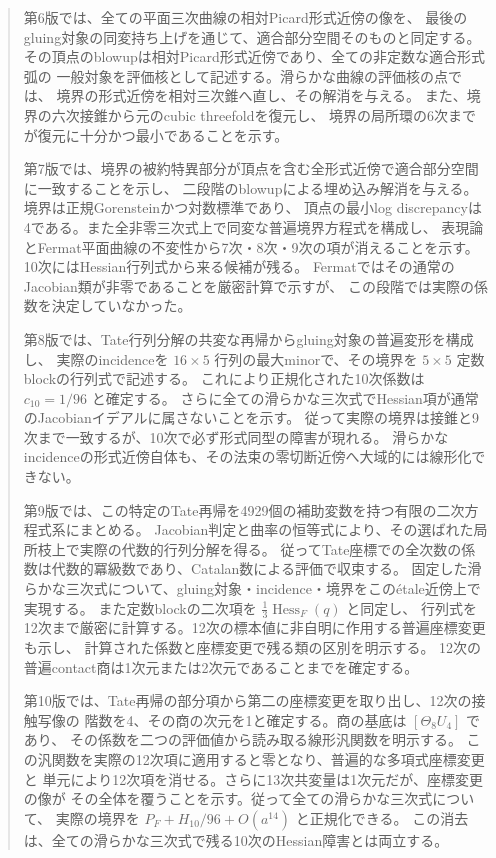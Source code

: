 \documentclass[a4paper,11pt]{ltjsarticle}
\theoremstyle{definition}
\begin{document}
\begin{abstract}
第6版では、全ての平面三次曲線の相対Picard形式近傍の像を、
最後のgluing対象の同変持ち上げを通じて、適合部分空間そのものと同定する。
その頂点のblowupは相対Picard形式近傍であり、全ての非定数な適合形式弧の
一般対象を評価核として記述する。滑らかな曲線の評価核の点では、
境界の形式近傍を相対三次錐へ直し、その解消を与える。
また、境界の六次接錐から元のcubic threefoldを復元し、
境界の局所環の6次までが復元に十分かつ最小であることを示す。

第7版では、境界の被約特異部分が頂点を含む全形式近傍で適合部分空間に一致することを示し、
二段階のblowupによる埋め込み解消を与える。境界は正規Gorensteinかつ対数標準であり、
頂点の最小log discrepancyは4である。また全非零三次式上で同変な普遍境界方程式を構成し、
表現論とFermat平面曲線の不変性から7次・8次・9次の項が消えることを示す。
10次にはHessian行列式から来る候補が残る。
Fermatではその通常のJacobian類が非零であることを厳密計算で示すが、
この段階では実際の係数を決定していなかった。

第8版では、Tate行列分解の共変な再帰からgluing対象の普遍変形を構成し、
実際のincidenceを $16\times5$ 行列の最大minorで、その境界を
$5\times5$ 定数blockの行列式で記述する。
これにより正規化された10次係数は $c_{10}=1/96$ と確定する。
さらに全ての滑らかな三次式でHessian項が通常のJacobianイデアルに属さないことを示す。
従って実際の境界は接錐と9次まで一致するが、10次で必ず形式同型の障害が現れる。
滑らかなincidenceの形式近傍自体も、その法束の零切断近傍へ大域的には線形化できない。

第9版では、この特定のTate再帰を4929個の補助変数を持つ有限の二次方程式系にまとめる。
Jacobian判定と曲率の恒等式により、その選ばれた局所枝上で実際の代数的行列分解を得る。
従ってTate座標での全次数の係数は代数的冪級数であり、Catalan数による評価で収束する。
固定した滑らかな三次式について、gluing対象・incidence・境界をこのétale近傍上で実現する。
また定数blockの二次項を $\frac13\operatorname{Hess}_F(q)$ と同定し、
行列式を12次まで厳密に計算する。12次の標本値に非自明に作用する普遍座標変更も示し、
計算された係数と座標変更で残る類の区別を明示する。
12次の普遍contact商は1次元または2次元であることまでを確定する。

第10版では、Tate再帰の部分項から第二の座標変更を取り出し、12次の接触写像の
階数を4、その商の次元を1と確定する。商の基底は $[\Theta_8U_4]$ であり、
その係数を二つの評価値から読み取る線形汎関数を明示する。
この汎関数を実際の12次項に適用すると零となり、普遍的な多項式座標変更と
単元により12次項を消せる。さらに13次共変量は1次元だが、座標変更の像が
その全体を覆うことを示す。従って全ての滑らかな三次式について、
実際の境界を $P_F+H_{10}/96+O(a^{14})$ と正規化できる。
この消去は、全ての滑らかな三次式で残る10次のHessian障害とは両立する。




\end{abstract}
\end{document}
